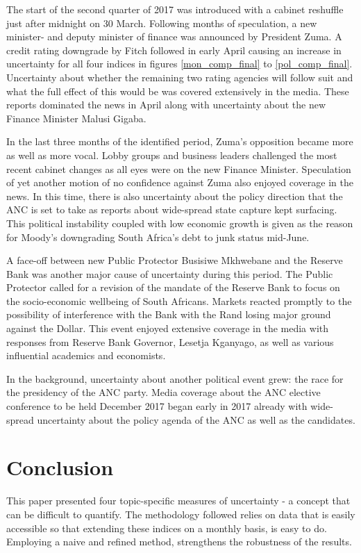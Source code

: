 \documentclass[11pt,preprint, authoryear]{elsarticle}
\numberwithin{equation}{section}
\numberwithin{figure}{section}
\numberwithin{table}{section}
\begin{document}
The start of the second quarter of 2017 was introduced with a cabinet
reshuffle just after midnight on 30 March. Following months of
speculation, a new minister- and deputy minister of finance was
announced by President Zuma. A credit rating downgrade by Fitch followed
in early April causing an increase in uncertainty for all four indices
in figures \ref{mon_comp_final} to \ref{pol_comp_final}. Uncertainty
about whether the remaining two rating agencies will follow suit and
what the full effect of this would be was covered extensively in the
media. These reports dominated the news in April along with uncertainty
about the new Finance Minister Malusi Gigaba.

In the last three months of the identified period, Zuma's opposition
became more as well as more vocal. Lobby groups and business leaders
challenged the most recent cabinet changes as all eyes were on the new
Finance Minister. Speculation of yet another motion of no confidence
against Zuma also enjoyed coverage in the news. In this time, there is
also uncertainty about the policy direction that the ANC is set to take
as reports about wide-spread state capture kept surfacing. This
political instability coupled with low economic growth is given as the
reason for Moody's downgrading South Africa's debt to junk status
mid-June.

A face-off between new Public Protector Busisiwe Mkhwebane and the
Reserve Bank was another major cause of uncertainty during this period.
The Public Protector called for a revision of the mandate of the Reserve
Bank to focus on the socio-economic wellbeing of South Africans. Markets
reacted promptly to the possibility of interference with the Bank with
the Rand losing major ground against the Dollar. This event enjoyed
extensive coverage in the media with responses from Reserve Bank
Governor, Lesetja Kganyago, as well as various influential academics and
economists.

In the background, uncertainty about another political event grew: the
race for the presidency of the ANC party. Media coverage about the ANC
elective conference to be held December 2017 began early in 2017 already
with wide-spread uncertainty about the policy agenda of the ANC as well
as the candidates.

\section{\texorpdfstring{Conclusion
\label{sec_conclude}}{Conclusion }}\label{conclusion}
This paper presented four topic-specific measures of uncertainty - a concept that can be difficult to quantify. The methodology followed relies on data that is easily accessible so that extending these indices on a monthly basis, is easy to do. Employing a naive and refined method, strengthens the robustness of the results. 
\end{document}
